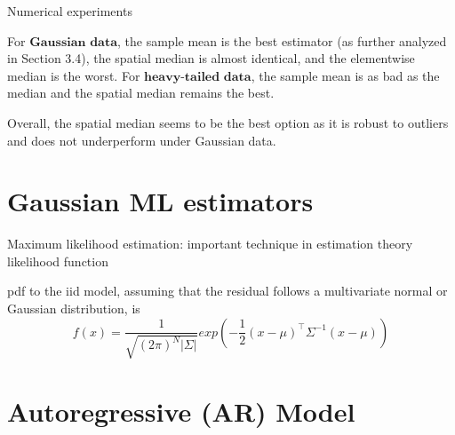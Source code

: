 Numerical experiments

For $\textbf{Gaussian data}$, the sample mean is the best estimator (as further analyzed in Section 3.4), the spatial median is almost identical, and the elementwise median is the worst. 
For $\textbf{heavy-tailed data}$, the sample mean is as bad as the median and the spatial median remains the best. 

Overall, the spatial median seems to be the best option as it is robust to outliers and does not underperform under Gaussian data.

\section{Gaussian ML estimators}
Maximum likelihood estimation: important technique in estimation theory
likelihood function

pdf to the iid model, assuming that the residual follows a multivariate normal or Gaussian distribution, is 
\[f(x) = \frac{1}{\sqrt{(2\pi)^N|\Sigma|}}exp(-\frac{1}{2}(x-\mu)^\intercal\Sigma^{-1}(x-\mu))\]


\section{Autoregressive (AR) Model}


    
    

